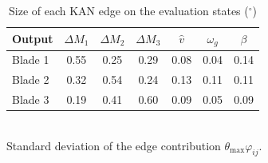 \begin{table}[!t]
\centering
\caption{Size of each KAN edge on the evaluation states ($^\circ$)}
\label{tab:edges}
\renewcommand{\arraystretch}{1.15}
\begin{tabular}{lcccccc}
\hline\hline
Output & $\Delta M_1$ & $\Delta M_2$ & $\Delta M_3$ & $\hat v$ & $\omega_g$ & $\beta$ \\
\hline
Blade 1 & 0.55 & 0.25 & 0.29 & 0.08 & 0.04 & 0.14 \\
Blade 2 & 0.32 & 0.54 & 0.24 & 0.13 & 0.11 & 0.11 \\
Blade 3 & 0.19 & 0.41 & 0.60 & 0.09 & 0.05 & 0.09 \\
\hline\hline
\end{tabular}
\\[2pt]\footnotesize Standard deviation of the edge contribution $\theta_{\max}\varphi_{ij}$.
\end{table}
